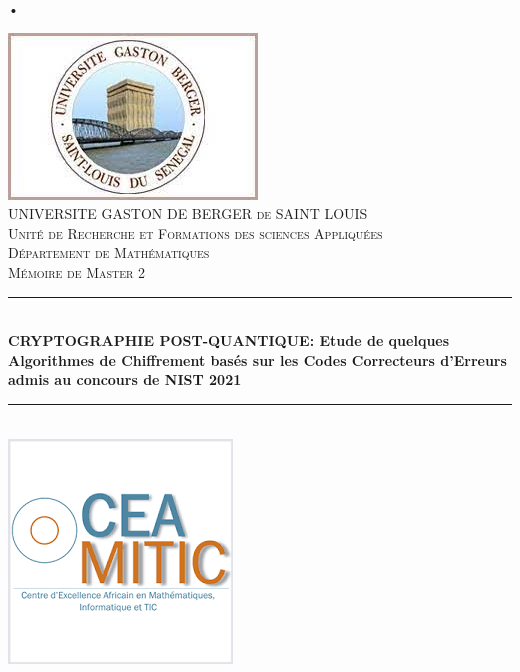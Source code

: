 \documentclass[12pt,openany]{report}
\newcommand{\HRule}{\rule{\linewidth}{0.5mm}}
\begin{document}
 \begin{flushleft}
•
\end{flushleft}

\baselineskip=18pt
\begin{titlepage}
 \begin{sffamily}
  \begin{center}
   \includegraphics[scale=0.5]{logo_ugb}~\\[0.8cm]
    \textsc{\LARGE UNIVERSITE GASTON DE BERGER de SAINT LOUIS}\\
    \textsc{Unité de Recherche et Formations des sciences Appliquées}\\
    \textsc{Département de Mathématiques}
    \\[2cm]
    \textsc{\Large Mémoire de Master 2}\\[1.5cm]
    \HRule \\[0.4cm]
    {\Large \bfseries CRYPTOGRAPHIE POST-QUANTIQUE: Etude de quelques Algorithmes de Chiffrement basés sur les Codes Correcteurs d'Erreurs admis au concours de NIST 2021 \\[0.4cm] }
    \HRule \\[1cm]
    \includegraphics[scale=0.4]{ciamitic}
    \\[1cm]
    \begin{minipage}{0.4\textwidth}

\end{minipage}
\end{center}
\end{sffamily}
\end{titlepage}
\end{document}

